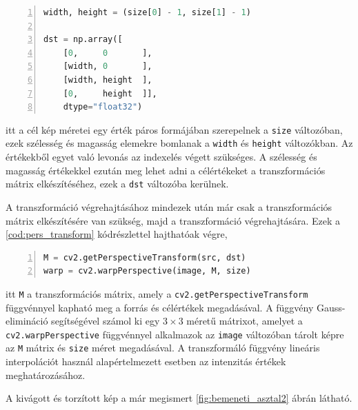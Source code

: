 \vspace{2mm}
\hspace{-10mm}
\begin{minipage}{\linewidth}
\begin{lstlisting}[language=Python, numbers=left, caption={A kimeneti értékek megadása.}, label={cod:destination}]
width, height = (size[0] - 1, size[1] - 1)

dst = np.array([
    [0,     0       ],
    [width, 0       ],
    [width, height  ],
    [0,     height  ]],
    dtype="float32")
\end{lstlisting}
\end{minipage}

\par itt a cél kép méretei egy érték páros formájában szerepelnek a \lstinline{size} változóban, ezek szélesség és magasság elemekre bomlanak a \lstinline{width} és \lstinline{height} változókban. Az értékekből egyet való levonás az indexelés végett szükséges. A szélesség és magasság értékekkel ezután meg lehet adni a célértékeket a transzformációs mátrix elkészítéséhez, ezek a \lstinline{dst} változóba kerülnek.
\par A transzformáció végrehajtásához mindezek után már csak a transzformációs mátrix elkészítésére van szükség, majd a transzformáció végrehajtására.
\newline Ezek a \ref{cod:pers_transform} kódrészlettel hajthatóak végre,

\vspace{2mm}
\hspace{-10mm}
\begin{minipage}{\linewidth}
\begin{lstlisting}[language=Python, numbers=left, caption={A transzformáció végrehajtása.}, label={cod:pers_transform}]
M = cv2.getPerspectiveTransform(src, dst)
warp = cv2.warpPerspective(image, M, size)
\end{lstlisting}
\end{minipage}

\par itt \lstinline{M} a transzformációs mátrix, amely a \lstinline{cv2.getPerspectiveTransform} függvénnyel \cite{opencv_docs} kapható meg a forrás és célértékek megadásával. A függvény Gauss-elimináció \cite{grcar2011mathematicians} segítségével számol ki egy $3\times3$ méretű mátrixot, amelyet a \lstinline{cv2.warpPerspective} függvénnyel \cite{opencv_docs} alkalmazok az \lstinline{image} változóban tárolt képre az \lstinline{M} mátrix és \lstinline{size} méret megadásával. A transzformáló függvény lineáris interpolációt \cite{blu0401interpolation} használ alapértelmezett esetben az intenzitás értékek meghatározásához.
\par A kivágott és torzított kép a már megismert \ref{fig:bemeneti_asztal2} ábrán látható.

